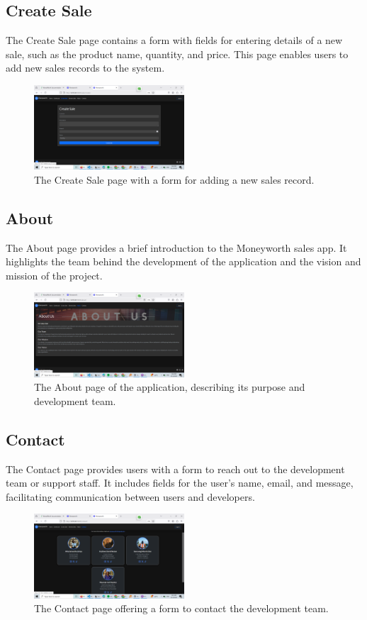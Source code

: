 \documentclass[12pt]{article}
\begin{document}
\subsection{Create Sale}
The Create Sale page contains a form with fields for entering details of a new sale, such as the product name, quantity, and price. This page enables users to add new sales records to the system.
\begin{figure}[H]
    \centering
    \includegraphics[width=0.5\textwidth]{create_sales.png}
    \caption{The Create Sale page with a form for adding a new sales record.}
\end{figure}

\subsection{About}
The About page provides a brief introduction to the Moneyworth sales app. It highlights the team behind the development of the application and the vision and mission of the project.
\begin{figure}[H]
    \centering
    \includegraphics[width=0.5\textwidth]{about_us.png}
    \caption{The About page of the application, describing its purpose and development team.}
\end{figure}

\subsection{Contact}
The Contact page provides users with a form to reach out to the development team or support staff. It includes fields for the user's name, email, and message, facilitating communication between users and developers.
\begin{figure}[H]
    \centering
    \includegraphics[width=0.5\textwidth]{contact_us.png}
    \caption{The Contact page offering a form to contact the development team.}
\end{figure}
\end{document}
